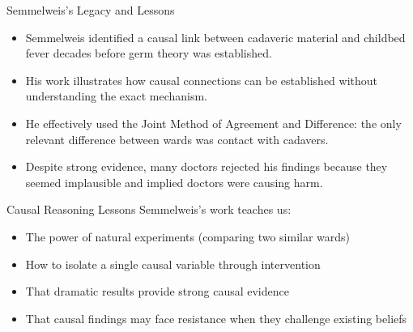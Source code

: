 \documentclass{beamer}
\begin{document}
\begin{frame}{Semmelweis's Legacy and Lessons}
    \begin{itemize}
        \item Semmelweis identified a causal link between cadaveric material and childbed fever decades before germ theory was established.
        \item His work illustrates how causal connections can be established without understanding the exact mechanism.
        \item He effectively used the Joint Method of Agreement and Difference: the only relevant difference between wards was contact with cadavers.
        \item Despite strong evidence, many doctors rejected his findings because they seemed implausible and implied doctors were causing harm.
    \end{itemize}
    
    \begin{alertblock}{Causal Reasoning Lessons}
        Semmelweis's work teaches us:
        \begin{itemize}
            \item The power of natural experiments (comparing two similar wards)
            \item How to isolate a single causal variable through intervention
            \item That dramatic results provide strong causal evidence
            \item That causal findings may face resistance when they challenge existing beliefs
        \end{itemize}
    \end{alertblock}
\end{frame}
\end{document}
